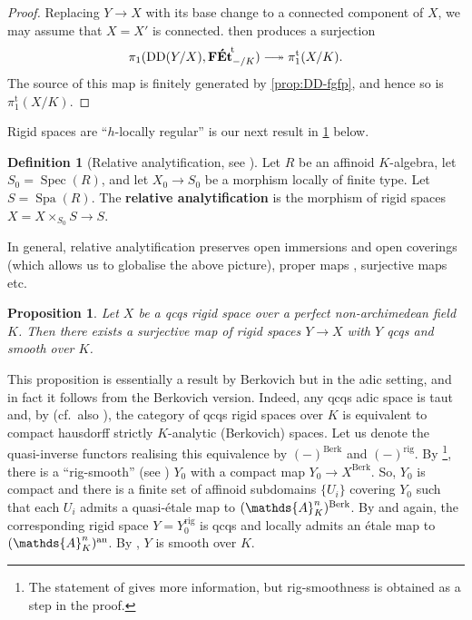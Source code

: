\documentclass[a4paper,twoside,11pt,reqno]{amsart}
\renewcommand{\mathbb}{\mathds}
\DeclareRobustCommand\longtwoheadrightarrow {\relbar\joinrel\twoheadrightarrow}
\newcommand{\surj}{\longtwoheadrightarrow}
\DeclareMathOperator{\Spec}{Spec}
\DeclareMathOperator{\Spa}{Spa}
\newcommand{\cat}[1]{\mathbf{#1}}
\newcommand{\pitame}{\pi_1^{\mathrm{t}}}
\newcommand{\FEtt}{{\cat{F\acute{E}t}}^{\!\mathrm{t}}}
\DeclareMathOperator{\Desc}{DD}
\newtheorem{prop}[thm]{Proposition}
\theoremstyle{definition}
\newtheorem{defi}[thm]{Definition}
\numberwithin{equation}{subsection}
\begin{document}
\begin{proof}
Replacing $Y\to X$ with its base change to a connected component of $X$, we may assume that $X=X'$ is connected.  then produces a surjection
\[ 
    \pi_1(\Desc(Y/X), \FEtt_{-/K}) \surj \pitame(X/K).
\]
The source of this map is finitely generated by \cref{prop:DD-fgfp}, and hence so is $\pitame(X/K)$. 
\end{proof}

Rigid spaces are ``$h$-locally regular'' is our next result in \cref{prop:h-locally-regular} below.

\begin{defi}[{Relative analytification, see \cite[Proposition~3.8]{Huber94:Generalization}}] \label{def:relative-analytification}
    Let $R$ be an affinoid $K$-algebra, let $S_0=\Spec(R)$, and let $X_0\to S_0$ be a morphism locally of finite type. Let $S=\Spa(R)$. The {\bf relative analytification} is the morphism of rigid spaces $X=X\times_{S_0} S\to S$. 
\end{defi}

In general, relative analytification preserves open immersions and open coverings (which allows us to globalise the above picture), proper maps \cite[Lemma~5.7.3]{HuberBook}, surjective maps \cite[Lemma~3.9]{Huber94:Generalization} etc.

\begin{prop} 
\label{prop:h-locally-regular}
    Let $X$ be a qcqs rigid space over a perfect non-archimedean field $K$. Then there exists a surjective map of rigid spaces $Y\to X$ with $Y$ qcqs and smooth over $K$.
\end{prop}

This proposition is essentially a result by Berkovich \cite[Theorem 1.3.1]{Berkovich:VanishingCyclesFormalSchemes} but in the adic setting, and in fact it follows from the Berkovich version.
Indeed, any qcqs adic space is taut and, by  \cite[Proposition 8.3.1+Remark 8.3.2]{HuberBook} (cf.\ also \cite[Theorem 1.6.1]{Berkovich:EtaleCohomology}), the category of qcqs rigid spaces over $K$ is equivalent to compact hausdorff strictly $K$-analytic (Berkovich) spaces. Let us denote the quasi-inverse functors realising this equivalence by $(-)^{\mathrm{Berk}}$ and $(-)^{\mathrm{rig}}$. By \cite[Theorem 1.3.1]{Berkovich:VanishingCyclesFormalSchemes}\footnote{The statement of \cite[Theorem 1.3.1]{Berkovich:VanishingCyclesFormalSchemes} gives more information, but rig-smoothness is obtained as a step in the proof.}, there is a ``rig-smooth'' (see \cite[p.~335]{Berkovich:SmoothLocallyContrII}) $Y_0$ with a compact map $Y_0 \to X^\mathrm{Berk}$. So, $Y_0$ is compact and there is a finite set of affinoid subdomains $\{U_i\}$ covering $Y_0$ such that each $U_i$ admits a quasi-\'etale map to $(\mathbb{A}^n_K)^{\rm Berk}$.
By 
\cite[Lemma 1.6.2]{Berkovich:EtaleCohomology} 
and
\cite[Proposition 8.3.1+Remark 8.3.2]{HuberBook} again,
the corresponding rigid space $Y = Y_0^{\mathrm{rig}}$ is qcqs and locally admits an \'etale map to $(\mathbb{A}^n_K)^{\rm an}$. By \cite[Corollary 1.6.10]{HuberBook}, $Y$ is smooth over $K$.
\end{document}
